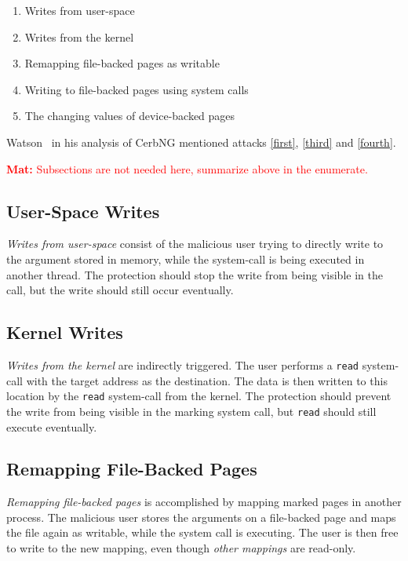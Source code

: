 \documentclass[conference]{IEEEtran}
\newcommand{\mat}[1]{\textcolor{red}{\textbf{Mat:} #1}}
\begin{document}
\begin{enumerate}
  \item \label{first} Writes from user-space
  \item \label{second} Writes from the kernel
  \item \label{third} Remapping file-backed pages as writable
  \item \label{fourth} Writing to file-backed pages using system calls
  \item \label{fifth} The changing values of device-backed pages
\end{enumerate}

Watson~\cite{watson2007exploiting} in his analysis of CerbNG mentioned attacks
\autoref{first}, \autoref{third} and \autoref{fourth}.

\mat{Subsections are not needed here, summarize above in the enumerate.}

\subsection{User-Space Writes}

\emph{Writes from user-space} consist of the malicious user trying to directly
write to the argument stored in memory, while the system-call is being executed
in another thread. The protection should stop the write from being visible in
the call, but the write should still occur eventually.

\subsection{Kernel Writes}

\emph{Writes from the kernel} are indirectly triggered. The user performs a
\texttt{read} system-call with the target address as the destination. The data
is then written to this location by the \texttt{read} system-call from the
kernel. The protection should prevent the write from being visible in the
marking system call, but \texttt{read} should still execute eventually.

\subsection{Remapping File-Backed Pages}

\emph{Remapping file-backed pages} is accomplished by mapping marked pages in
another process. The malicious user stores the arguments on a file-backed page
and maps the file again as writable, while the system call is executing. The
user is then free to write to the new mapping, even though \emph{other mappings}
are read-only.
\end{document}
